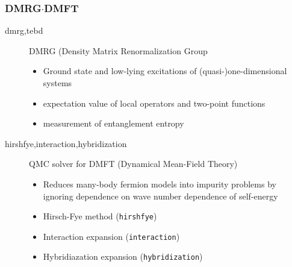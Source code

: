 \begin{frame}[t,fragile]
  \frametitle{DMRG$\cdot$DMFT}
  \begin{description}
  \item[dmrg,tebd] DMRG (Density Matrix Renormalization Group
    \begin{itemize}
      \item Ground state and low-lying excitations of (quasi-)one-dimensional systems
      \item expectation value of local operators and two-point functions
      \item measurement of entanglement entropy
    \end{itemize}
  \item[hirshfye,interaction,hybridization] QMC solver for DMFT (Dynamical Mean-Field Theory)
    \begin{itemize}
      \item Reduces many-body fermion models into impurity problems by ignoring dependence on wave number dependence of self-energy
      \item Hirsch-Fye method ({\tt hirshfye})
      \item Interaction expansion ({\tt interaction})
      \item Hybridiazation expansion ({\tt hybridization})
    \end{itemize}
  \end{description}
\end{frame}



